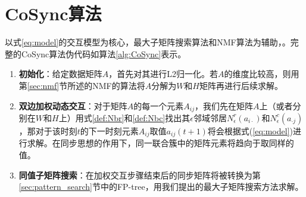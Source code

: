 \section{CoSync算法}
\label{sec:algorithm}
\vspace{-2mm}
以式\ref{eq:model}的交互模型为核心，最大子矩阵搜索算法和NMF算法为辅助，。完整的CoSync算法伪代码如算法\ref{alg:CoSync}表示。
\begin{enumerate}
\item \textbf{初始化}：给定数据矩阵$A$，首先对其进行L2归一化。若$A$的维度比较高，则用第\ref{sec:nmf}节所述的NMF的算法将$A$分解为$W$和$H$矩阵再进行后续求解。
\item \textbf{双边加权动态交互}：对于矩阵$A$的每一个元素$A_{ij}$，我们先在矩阵$A$上（或者分别在$W$和$H$上）用式\ref{def:Nbr}和\ref{def:Nbc}找出其$\epsilon$邻域邻居$N_{\epsilon}^{r}(a_{i\cdot})$和$N_{\epsilon}^{c}(a_{\cdot{}j})$，那对于该时刻$t$的下一时刻元素$A_{ij}$取值$a_{ij}(t+1)$将会根据式(\ref{eq:model})进行求解。在同步思想的作用下，同一联合簇中的矩阵元素将趋向于取同样的值。
\item \textbf{同值子矩阵搜索}：在加权交互步骤结束后的同步矩阵将被转换为第\ref{sec:pattern_search}节中的FP-tree，用我们提出的最大子矩阵搜索方法求解。
\end{enumerate}

